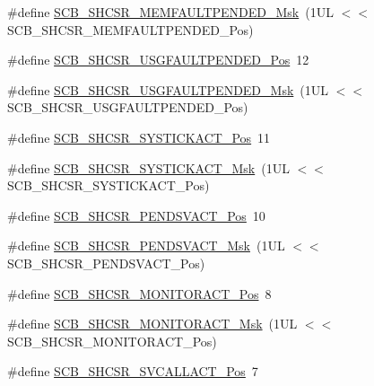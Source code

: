 \begin{DoxyCompactItemize}
\item 
\#define \mbox{\hyperlink{group___c_m_s_i_s___s_c_b_ga9abc6c2e395f9e5af4ce05fc420fb04c}{S\+C\+B\+\_\+\+S\+H\+C\+S\+R\+\_\+\+M\+E\+M\+F\+A\+U\+L\+T\+P\+E\+N\+D\+E\+D\+\_\+\+Msk}}~(1\+U\+L $<$$<$ S\+C\+B\+\_\+\+S\+H\+C\+S\+R\+\_\+\+M\+E\+M\+F\+A\+U\+L\+T\+P\+E\+N\+D\+E\+D\+\_\+\+Pos)
\item 
\#define \mbox{\hyperlink{group___c_m_s_i_s___s_c_b_ga3cf03acf1fdc2edc3b047ddd47ebbf87}{S\+C\+B\+\_\+\+S\+H\+C\+S\+R\+\_\+\+U\+S\+G\+F\+A\+U\+L\+T\+P\+E\+N\+D\+E\+D\+\_\+\+Pos}}~12
\item 
\#define \mbox{\hyperlink{group___c_m_s_i_s___s_c_b_ga122b4f732732010895e438803a29d3cc}{S\+C\+B\+\_\+\+S\+H\+C\+S\+R\+\_\+\+U\+S\+G\+F\+A\+U\+L\+T\+P\+E\+N\+D\+E\+D\+\_\+\+Msk}}~(1\+U\+L $<$$<$ S\+C\+B\+\_\+\+S\+H\+C\+S\+R\+\_\+\+U\+S\+G\+F\+A\+U\+L\+T\+P\+E\+N\+D\+E\+D\+\_\+\+Pos)
\item 
\#define \mbox{\hyperlink{group___c_m_s_i_s___s_c_b_gaec9ca3b1213c49e2442373445e1697de}{S\+C\+B\+\_\+\+S\+H\+C\+S\+R\+\_\+\+S\+Y\+S\+T\+I\+C\+K\+A\+C\+T\+\_\+\+Pos}}~11
\item 
\#define \mbox{\hyperlink{group___c_m_s_i_s___s_c_b_gafef530088dc6d6bfc9f1893d52853684}{S\+C\+B\+\_\+\+S\+H\+C\+S\+R\+\_\+\+S\+Y\+S\+T\+I\+C\+K\+A\+C\+T\+\_\+\+Msk}}~(1\+U\+L $<$$<$ S\+C\+B\+\_\+\+S\+H\+C\+S\+R\+\_\+\+S\+Y\+S\+T\+I\+C\+K\+A\+C\+T\+\_\+\+Pos)
\item 
\#define \mbox{\hyperlink{group___c_m_s_i_s___s_c_b_ga9b9fa69ce4c5ce7fe0861dbccfb15939}{S\+C\+B\+\_\+\+S\+H\+C\+S\+R\+\_\+\+P\+E\+N\+D\+S\+V\+A\+C\+T\+\_\+\+Pos}}~10
\item 
\#define \mbox{\hyperlink{group___c_m_s_i_s___s_c_b_gae0e837241a515d4cbadaaae1faa8e039}{S\+C\+B\+\_\+\+S\+H\+C\+S\+R\+\_\+\+P\+E\+N\+D\+S\+V\+A\+C\+T\+\_\+\+Msk}}~(1\+U\+L $<$$<$ S\+C\+B\+\_\+\+S\+H\+C\+S\+R\+\_\+\+P\+E\+N\+D\+S\+V\+A\+C\+T\+\_\+\+Pos)
\item 
\#define \mbox{\hyperlink{group___c_m_s_i_s___s_c_b_ga8b71cf4c61803752a41c96deb00d26af}{S\+C\+B\+\_\+\+S\+H\+C\+S\+R\+\_\+\+M\+O\+N\+I\+T\+O\+R\+A\+C\+T\+\_\+\+Pos}}~8
\item 
\#define \mbox{\hyperlink{group___c_m_s_i_s___s_c_b_gaad09b4bc36e9bccccc2e110d20b16e1a}{S\+C\+B\+\_\+\+S\+H\+C\+S\+R\+\_\+\+M\+O\+N\+I\+T\+O\+R\+A\+C\+T\+\_\+\+Msk}}~(1\+U\+L $<$$<$ S\+C\+B\+\_\+\+S\+H\+C\+S\+R\+\_\+\+M\+O\+N\+I\+T\+O\+R\+A\+C\+T\+\_\+\+Pos)
\item 
\#define \mbox{\hyperlink{group___c_m_s_i_s___s_c_b_ga977f5176be2bc8b123873861b38bc02f}{S\+C\+B\+\_\+\+S\+H\+C\+S\+R\+\_\+\+S\+V\+C\+A\+L\+L\+A\+C\+T\+\_\+\+Pos}}~7
$$
\end{DoxyCompactItemize}
